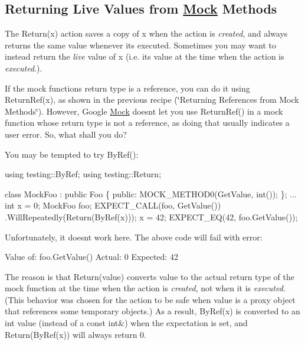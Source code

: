 \subsection*{Returning Live Values from \hyperlink{class_mock}{Mock} Methods}

The {\ttfamily Return(x)} action saves a copy of {\ttfamily x} when the action is {\itshape created}, and always returns the same value whenever it\textquotesingle{}s executed. Sometimes you may want to instead return the {\itshape live} value of {\ttfamily x} (i.\+e. its value at the time when the action is {\itshape executed}.).

If the mock function\textquotesingle{}s return type is a reference, you can do it using {\ttfamily Return\+Ref(x)}, as shown in the previous recipe (\char`\"{}\+Returning References
from Mock Methods\char`\"{}). However, Google \hyperlink{class_mock}{Mock} doesn\textquotesingle{}t let you use {\ttfamily Return\+Ref()} in a mock function whose return type is not a reference, as doing that usually indicates a user error. So, what shall you do?

You may be tempted to try {\ttfamily By\+Ref()}\+:


\begin{DoxyCode}
using testing::ByRef;
using testing::Return;

class MockFoo : public Foo \{
 public:
  MOCK\_METHOD0(GetValue, int());
\};
...
  int x = 0;
  MockFoo foo;
  EXPECT\_CALL(foo, GetValue())
      .WillRepeatedly(Return(ByRef(x)));
  x = 42;
  EXPECT\_EQ(42, foo.GetValue());
\end{DoxyCode}


Unfortunately, it doesn\textquotesingle{}t work here. The above code will fail with error\+:


\begin{DoxyCode}
Value of: foo.GetValue()
  Actual: 0
Expected: 42
\end{DoxyCode}


The reason is that {\ttfamily Return(value)} converts {\ttfamily value} to the actual return type of the mock function at the time when the action is {\itshape created}, not when it is {\itshape executed}. (This behavior was chosen for the action to be safe when {\ttfamily value} is a proxy object that references some temporary objects.) As a result, {\ttfamily By\+Ref(x)} is converted to an {\ttfamily int} value (instead of a {\ttfamily const int\&}) when the expectation is set, and {\ttfamily Return(\+By\+Ref(x))} will always return 0.

